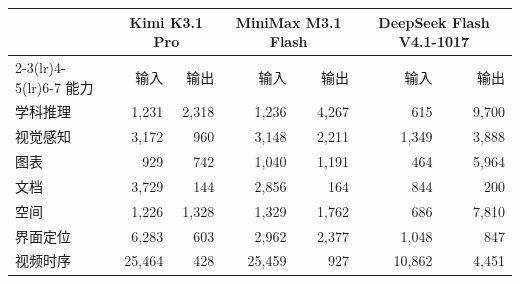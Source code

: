 \begin{tabular}{l*{3}{rr}}
\toprule
 & \multicolumn{2}{c}{Kimi K3.1 Pro} & \multicolumn{2}{c}{MiniMax M3.1 Flash} & \multicolumn{2}{c}{DeepSeek Flash V4.1-1017} \\
\cmidrule(lr){2-3}\cmidrule(lr){4-5}\cmidrule(lr){6-7}
能力 & 输入 & 输出 & 输入 & 输出 & 输入 & 输出 \\
\midrule
学科推理 & 1,231 & 2,318 & 1,236 & 4,267 & 615 & 9,700 \\
视觉感知 & 3,172 & 960 & 3,148 & 2,211 & 1,349 & 3,888 \\
图表 & 929 & 742 & 1,040 & 1,191 & 464 & 5,964 \\
文档 & 3,729 & 144 & 2,856 & 164 & 844 & 200 \\
空间 & 1,226 & 1,328 & 1,329 & 1,762 & 686 & 7,810 \\
界面定位 & 6,283 & 603 & 2,962 & 2,377 & 1,048 & 847 \\
视频时序 & 25,464 & 428 & 25,459 & 927 & 10,862 & 4,451 \\
\bottomrule
\end{tabular}
